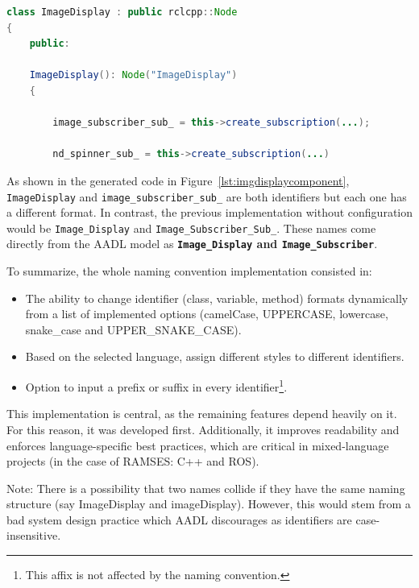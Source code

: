 \begin{lstlisting}[language=Java, caption={Generated Code of the ImageDisplay Component}, label={lst:imgdisplaycomponent}]
class ImageDisplay : public rclcpp::Node
{
	public:
	
	ImageDisplay(): Node("ImageDisplay")
	{
		
		image_subscriber_sub_ = this->create_subscription(...);
		
		nd_spinner_sub_ = this->create_subscription(...)
\end{lstlisting}

As shown in the generated code in Figure~\ref{lst:imgdisplaycomponent}, \texttt{ImageDisplay} and \texttt{image\_subscriber\_sub\_} are both \glspl{identifier} but each one has a different format. In contrast, the previous implementation without configuration would be \texttt{Image\_Display} and \texttt{Image\_Subscriber\_Sub\_}. These names come directly from the \gls{AADL} model as \textbf{\texttt{Image\_Display} and \texttt{Image\_Subscriber}}.

To summarize, the whole naming convention implementation consisted in:

\begin{itemize} 
	\item The ability to change \gls{identifier} (class, variable, method) formats dynamically from a list of implemented options (camelCase, UPPERCASE, lowercase, snake\_case and UPPER\_SNAKE\_CASE).
	\item Based on the selected language, assign different styles to different \glspl{identifier}.
	\item Option to input a prefix or suffix in every \gls{identifier}\footnote{This affix is not affected by the naming convention.}.
\end{itemize}

This implementation is central, as the remaining features depend heavily on it. For this reason, it was developed first. Additionally, it improves readability and enforces language-specific best practices, which are critical in mixed-language projects (in the case of \gls{RAMSES}: C++ and \gls{ROS}).

\begin{tcolorbox}[colback=green!5, colframe=green!40!black] 
	Note: There is a possibility that two names collide if they have the same naming structure (say ImageDisplay and imageDisplay). However, this would stem from a bad system design practice which \gls{AADL} discourages as identifiers are case-insensitive.
\end{tcolorbox}


